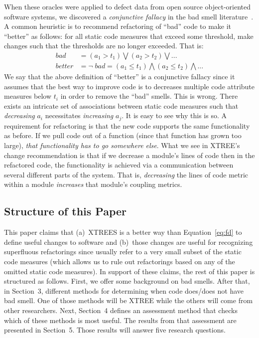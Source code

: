 \documentclass[twocolumn,5p]{elsarticle}
\newcommand{\eq}[1]{Equation~\ref{eq:#1}}
\theoremstyle{break}
\begin{document}
When these oracles were applied to defect data from
open source object-oriented software systems, we discovered a {\em conjunctive fallacy}
in the bad smell literature~\cite{erni96,bender99,Shatnawi10,Alves2010,hermans15}.
A common heuristic is to recommend refactoring of ``bad'' code
to make it ``better''   as follows: for all static code measures that exceed some threshold, make changes such that the thresholds are no longer exceeded. That is:
\begin{equation}\label{eq:df}
\scriptstyle
\begin{array}{rl}
\mathit{bad} & = \left(a_1 > t_1 \right) \bigvee \left(a_2 > t_2\right) \bigvee    ... \\
\mathit{better} & = \neg\;\mathit{bad} = \left(a_1 \le t_1 \right) \bigwedge \left(a_2 \le t_2\right)  \bigwedge  ...
\end{array}
\end{equation}
We say that the above definition of ``better'' is a conjunctive fallacy
since it assumes that the best way to improve code is to decreases multiple code attribute measures below $t_i$ in order
to remove the ``bad'' smells. This is wrong.  
There exists an intricate set of associations between static code measures
such that {\em decreasing}  $a_i$ necessitates {\em increasing} $a_j$.
It is easy to see why this is so.
A requirement for  refactoring is that the new code supports the same functionality
as before. If we pull code out of a function (since that function has grown too
large), {\em that functionality has to go somewhere else}. What we see in XTREE's change
recommendation is that if we decrease a module's lines of code  then in the refactored
code, the functionality is achieved via a communication between several different parts
of the system. That is, {\em decreasing} the lines of code metric within a module {\em increases}
that module's coupling metrics.

\subsection{Structure of this Paper}

This paper  claims that (a)~XTREES is a  better way than \eq{fd}  to define useful changes to software and (b)~those changes are useful for recognizing   superfluous refactorings since usually refer to a very 
small subset of the static code measures (which allows us to rule out refactorings based on any of the omitted
static code measures). 
In support of these claims, 
the rest of this paper is structured as follows. First, we offer some background on bad smells. After that,
  in Section~3, 
  different methods for determining when code does/does not have bad smell. One of those methods
  will be XTREE while the others will come from other researchers. Next,    Section~4
  defines an assessment method that checks which of these methods is most useful. The results from that assessment 
  are presented in Section~5. Those results will answer five research questions.
\end{document}
